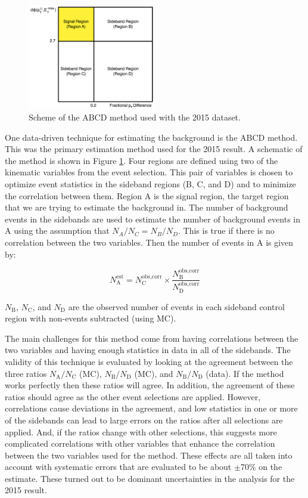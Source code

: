 \begin{figure}[htb]
\centering
\includegraphics[width=0.5\textwidth]{Figures/abcd2.png}
\caption{Scheme of the ABCD method used with the 2015 dataset.}
\label{fig:abcd}
\end{figure}

One data-driven technique for estimating the \Zjets background is the ABCD method. This was the primary estimation method used for the 2015 result. A schematic of the method is shown in Figure \ref{fig:abcd}. Four regions are defined using two of the kinematic variables from the event selection. This pair of variables is chosen to optimize event statistics in the sideband regions (B, C, and D) and to minimize the correlation between them. Region A is the signal region, the target region that we are trying to estimate the background in. The number of background events in the sidebands are used to estimate the number of background events in A using the assumption that $N_A/N_C = N_B/N_D$. This is true if there is no correlation between the two variables. Then the number of \Zjets events in A is given by:

\begin{equation}
N_\text{A}^\text{est} = N_\text{C}^\text{obs,corr} \times \frac{N_\text{B}^\text{obs,corr}}{N_\text{D}^\text{obs,corr}}
\end{equation}

\noindent $N_\text{B}$, $N_\text{C}$, and $N_\text{D}$ are the observed number of events in each sideband control region with non-\Zjets events subtracted (using MC).

The main challenges for this method come from having correlations between the two variables and having enough statistics in data in all of the sidebands. The validity of this technique is evaluated by looking at the agreement between the three ratios $N_\text{A}/N_\text{C}$ (MC), $N_\text{B}/N_\text{D}$ (MC), and $N_\text{B}/N_\text{D}$ (data). If the method works perfectly then these ratios will agree. In addition, the agreement of these ratios should agree as the other event selections are applied. However, correlations cause deviations in the agreement, and low statistics in one or more of the sidebands can lead to large errors on the ratios after all selections are applied. And, if the ratios change with other selections, this suggests more complicated correlations with other variables that enhance the correlation between the two variables used for the method. These effects are all taken into account with systematic errors that are evaluated to be about $\pm$70\% on the \Zjets estimate. These turned out to be dominant uncertainties in the analysis for the 2015 result.

